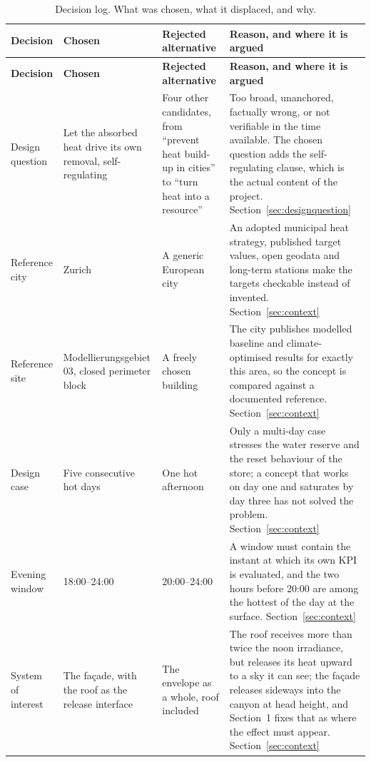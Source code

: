\begin{longtable}{L{2.6cm} L{3.0cm} L{3.0cm} L{5.7cm}}
\caption{Decision log. What was chosen, what it displaced, and why.}
\label{tab:decisionlog}\\
\toprule
\textbf{Decision} & \textbf{Chosen} & \textbf{Rejected alternative} & \textbf{Reason, and where it is argued} \\
\midrule
\endfirsthead
\toprule
\textbf{Decision} & \textbf{Chosen} & \textbf{Rejected alternative} & \textbf{Reason, and where it is argued} \\
\midrule
\endhead
\bottomrule
\endfoot

Design question & Let the absorbed heat drive its own removal, self-regulating & Four other candidates, from \enquote{prevent heat build-up in cities} to \enquote{turn heat into a resource} & Too broad, unanchored, factually wrong, or not verifiable in the time available. The chosen question adds the self-regulating clause, which is the actual content of the project. Section~\ref{sec:designquestion} \\

Reference city & Zurich & A generic European city & An adopted municipal heat strategy, published target values, open geodata and long-term stations make the targets checkable instead of invented. Section~\ref{sec:context} \\

Reference site & Modellierungsgebiet 03, closed perimeter block & A freely chosen building & The city publishes modelled baseline and climate-optimised results for exactly this area, so the concept is compared against a documented reference. Section~\ref{sec:context} \\

Design case & Five consecutive hot days & One hot afternoon & Only a multi-day case stresses the water reserve and the reset behaviour of the store; a concept that works on day one and saturates by day three has not solved the problem. Section~\ref{sec:context} \\

Evening window & 18:00--24:00 & 20:00--24:00 & A window must contain the instant at which its own KPI is evaluated, and the two hours before 20:00 are among the hottest of the day at the surface. Section~\ref{sec:context} \\

System of interest & The façade, with the roof as the release interface & The envelope as a whole, roof included & The roof receives more than twice the noon irradiance, but releases its heat upward to a sky it can see; the façade releases sideways into the canyon at head height, and Section~1 fixes that as where the effect must appear. Section~\ref{sec:context} \\


\end{longtable}
